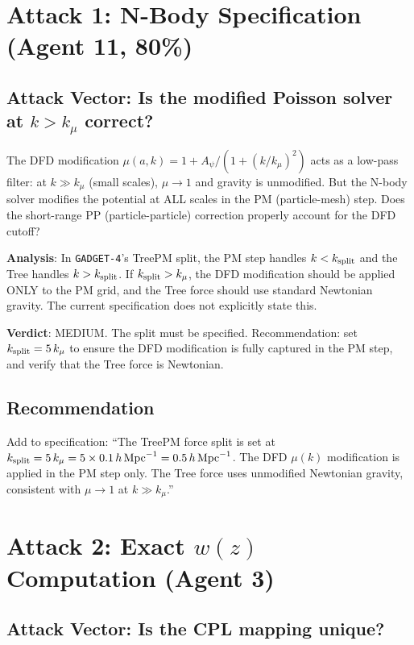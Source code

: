 \documentclass[11pt,a4paper]{article}
\begin{document}
\section{Attack 1: N-Body Specification (Agent 11, 80\%)}

\subsection{Attack Vector: Is the modified Poisson solver at $k > k_\mu$ correct?}

The DFD modification $\mu(a,k) = 1 + A_\psi/(1+(k/k_\mu)^2)$ acts as a low-pass filter: at $k \gg k_\mu$ (small scales), $\mu \to 1$ and gravity is unmodified. But the N-body solver modifies the potential at ALL scales in the PM (particle-mesh) step. Does the short-range PP (particle-particle) correction properly account for the DFD cutoff?

\textbf{Analysis}: In \texttt{GADGET-4}'s TreePM split, the PM step handles $k < k_{\rm split}$ and the Tree handles $k > k_{\rm split}$. If $k_{\rm split} > k_\mu$, the DFD modification should be applied ONLY to the PM grid, and the Tree force should use standard Newtonian gravity. The current specification does not explicitly state this.

\textbf{Verdict}: MEDIUM. The split must be specified. Recommendation: set $k_{\rm split} = 5\,k_\mu$ to ensure the DFD modification is fully captured in the PM step, and verify that the Tree force is Newtonian.

\subsection{Recommendation}

Add to specification: ``The TreePM force split is set at $k_{\rm split} = 5\,k_\mu = 5 \times 0.1\,h\,\mathrm{Mpc}^{-1} = 0.5\,h\,\mathrm{Mpc}^{-1}$. The DFD $\mu(k)$ modification is applied in the PM step only. The Tree force uses unmodified Newtonian gravity, consistent with $\mu \to 1$ at $k \gg k_\mu$.''

\section{Attack 2: Exact $w(z)$ Computation (Agent 3)}

\subsection{Attack Vector: Is the CPL mapping unique?}
\end{document}
